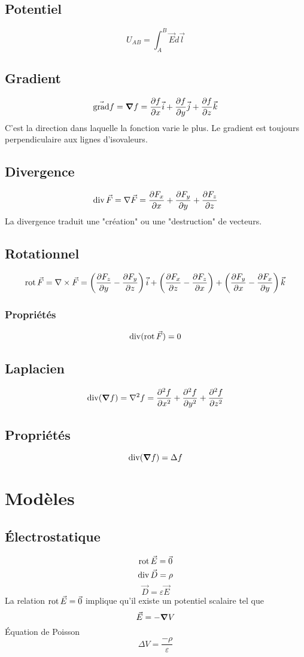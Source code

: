\documentclass[resume]{subfiles}
\begin{document}
\subsection{Potentiel}
$$U_{AB}=\int_{A}^{B}\vec{E}d\vec{l}$$
\subsection{Gradient}
$$\vec{\text{grad}}f=\grad f=\frac{\partial f}{\partial x}\vec{i}+\frac{\partial f}{\partial y}\vec{j}+\frac{\partial f}{\partial z}\vec{k}$$
C'est la direction dans laquelle la fonction varie le plus. Le gradient est toujours perpendiculaire aux lignes d'isovaleurs.
\subsection{Divergence}
$$\operatorname{div}\vec{F}=\nabla \vec{F}=\frac{\partial F_x}{\partial x}+\frac{\partial F_y}{\partial y}+\frac{\partial F_z}{\partial z}$$
La divergence traduit une "création" ou une "destruction" de vecteurs.
\subsection{Rotationnel}
$$\operatorname{rot} \vec{F}=\nabla \times \vec{F}=\left(\frac{\partial F_z}{\partial y}-\frac{\partial F_y}{\partial z}\right)\vec{i}+\left(\frac{\partial F_x}{\partial z}- \frac{\partial F_z}{\partial x}\right)+\left(\frac{\partial F_y}{\partial x}-\frac{\partial F_x}{\partial y}\right)\vec{k}$$
\subsubsection{Propriétés}
$$\operatorname{div}(\operatorname{rot} \vec{F})=0$$
\subsection{Laplacien}
$$\operatorname{div}(\grad f)=\nabla^2 f=\frac{\partial^2 f}{\partial x^2}+\frac{\partial^2 f}{\partial y^2}+\frac{\partial^2 f}{\partial z^2}$$
\subsection{Propriétés}
$$\operatorname{div}(\grad f)=\Delta f$$

\section{Modèles}
\subsection{Électrostatique}
$$\operatorname{rot}\vec{E}=\vec{0}$$
$$\operatorname{div}\vec{D}=\rho$$
$$\vec{D}=\varepsilon\vec{E}$$
La relation $\operatorname{rot}\vec{E}=\vec{0}$ implique qu'il existe un potentiel scalaire tel que
$$\vec{E}=-\grad V$$
Équation de Poisson
$$\Delta V=\frac{-\rho}{\varepsilon}$$
\end{document}
